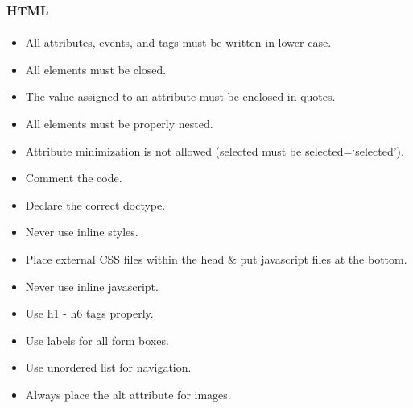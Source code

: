 \documentclass[paper=a4, fontsize=11pt]{scrartcl} %
\numberwithin{equation}{section} %
\numberwithin{figure}{section} %
\numberwithin{table}{section} %
\begin{document}
  \subsection{\textsc{html}}
  \begin{itemize}
    \item All attributes, events, and tags must be written in lower case.
    \item All elements must be closed.
    \item The value assigned to an attribute must be enclosed in quotes.
    \item All elements must be properly nested.
    \item Attribute minimization is not allowed (selected must be selected=`selected').
    \item Comment the code.
    \item Declare the correct doctype.
    \item Never use inline styles.
    \item Place external CSS files within the head \& put  javascript files at the bottom.
    \item Never use inline javascript.
    \item Use h1 - h6 tags properly.
    \item Use labels for all form boxes.
    \item Use unordered list for navigation.
    \item Always place the alt attribute for images.
  \end{itemize}
  
\end{document}

